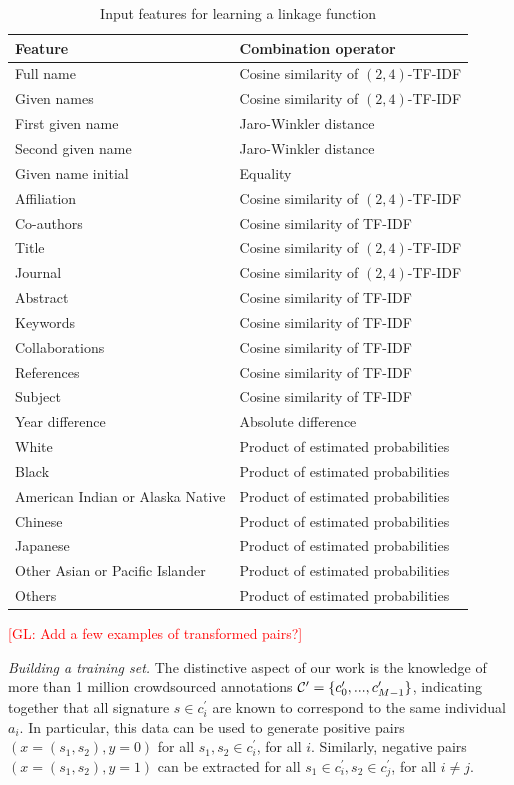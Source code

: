 \documentclass{article}
\newcommand{\glnote}[1]{\textcolor{red}{[GL: #1]}}
\begin{document}
\begin{table}
\caption{Input features for learning a linkage function}
\label{table:features}
\centering
\begin{tabular}{|l|l|}
  \hline
  \textbf{Feature} & \textbf{Combination operator}\\
  \hline
  \hline
  Full name & Cosine similarity of $(2,4)$-TF-IDF\\
  Given names & Cosine similarity of $(2,4)$-TF-IDF\\
  First given name & Jaro-Winkler distance\\
  Second given name & Jaro-Winkler distance\\
  Given name initial & Equality\\
  Affiliation & Cosine similarity of $(2,4)$-TF-IDF\\
  Co-authors & Cosine similarity of TF-IDF\\
  Title & Cosine similarity of $(2,4)$-TF-IDF\\
  Journal & Cosine similarity of $(2,4)$-TF-IDF\\
  Abstract & Cosine similarity of TF-IDF\\
  Keywords & Cosine similarity of TF-IDF\\
  Collaborations & Cosine similarity of TF-IDF\\
  References & Cosine similarity of TF-IDF\\
  Subject & Cosine similarity of TF-IDF\\
  Year difference & Absolute difference\\
  \hline
  White & Product of estimated probabilities\\
  Black & Product of estimated probabilities\\
  American Indian or Alaska Native & Product of estimated probabilities\\
  Chinese & Product of estimated probabilities\\
  Japanese & Product of estimated probabilities\\
  Other Asian or Pacific Islander & Product of estimated probabilities\\
  Others & Product of estimated probabilities\\
  \hline
\end{tabular}
\end{table}

\glnote{Add a few examples of transformed pairs?}

\textit{Building a training set.} The distinctive aspect of our work is the
knowledge of more than 1 million crowdsourced annotations ${\cal C}^\prime = \{
c_0^\prime, ..., c_{M-1}^\prime \}$, indicating together that all signature $s \in
c_i^\prime$ are known to correspond to the same individual $a_i$. In particular,
this data can be used to generate positive pairs $(x=(s_1, s_2), y=0)$ for all
$s_1, s_2 \in c_i^\prime$, for all $i$. Similarly, negative pairs $(x=(s_1,
s_2), y=1)$ can be extracted for all $s_1 \in c_i^\prime, s_2 \in c_j^\prime$, for
all $i \neq j$.
\end{document}
